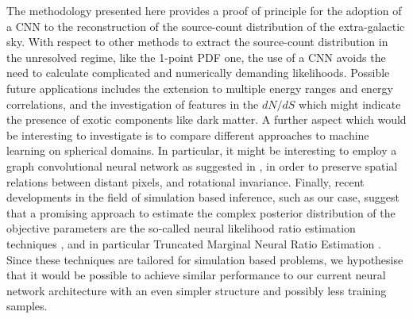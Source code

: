  The methodology presented here provides a proof of principle for the adoption of a CNN to the reconstruction of the source-count distribution of the extra-galactic sky. 
With respect to other methods to extract the source-count distribution in the unresolved regime, like the 1-point PDF one, the use of a CNN avoids the need to calculate complicated and numerically demanding likelihoods.
 Possible future applications includes the extension to multiple energy ranges and energy correlations, and the investigation of features in the $dN/dS$ which might indicate the presence of exotic components like dark matter.
A further aspect which would be interesting to investigate is to compare different approaches to machine learning on spherical domains. In particular, it might be interesting to employ a graph convolutional neural network as suggested in \cite{DBLP:journals/corr/abs-2012-15000}, in order to preserve spatial relations between distant pixels, and rotational invariance.
Finally, recent developments in the field of simulation based inference, such as our case, suggest that a promising approach to estimate the complex posterior distribution of the objective parameters are the so-called neural likelihood ratio estimation techniques \cite{Durkan2020}, and in particular Truncated Marginal Neural Ratio Estimation \cite{Miller2021arxiv,Miller2021,AnauMontel:2022ppb}. Since these techniques are tailored for simulation based problems, we hypothesise that it would be possible to achieve similar performance to our current neural network architecture with an even simpler structure and possibly less training samples. 
 
 

\label{sec:conclusions}

